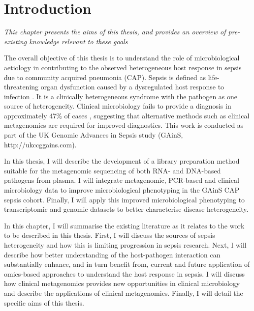 \chapter{Introduction}
\label{ch:Introduction}
\textit{This chapter presents the aims of this thesis, and provides an overview of pre-existing knowledge relevant to these goals}

\startcontents[chapters]{\vspace{-1.4cm}}
\singlespacing
{}
\doublespacing
\vspace{0.5cm}

The overall objective of this thesis is to understand the role of microbiological aetiology in contributing to the observed heterogeneous host response in sepsis due to community acquired pneumonia (CAP). Sepsis is defined as life-threatening organ dysfunction caused by a dysregulated host response to infection \parencite{Singer2016}. It is a clinically heterogeneous syndrome with the pathogen as one source of heterogeneity. Clinical microbiology fails to provide a diagnosis in approximately 47\% of cases \parencite{Gupta2016}, suggesting that alternative methods such as clinical metagenomics are required for improved diagnostics. This work is conducted as part of the UK Genomic Advances in Sepsis study (GAinS, http://ukccggains.com). 

In this thesis, I will describe the development of a library preparation method suitable for the metagenomic sequencing of both RNA- and DNA-based pathogens from plasma. I will integrate metagenomic, PCR-based and clinical microbiology data to improve microbiological phenotyping in the GAinS CAP sepsis cohort. Finally, I will apply this improved microbiological phenotyping to transcriptomic and genomic datasets to better characterise disease heterogeneity. 

In this chapter, I will summarise the existing literature as it relates to the work to be described in this thesis. First, I will discuss the sources of sepsis heterogeneity and how this is limiting progression in sepsis research. Next, I will describe how better understanding of the host-pathogen interaction can substantially enhance, and in turn benefit from, current and future application of omics-based approaches to understand the host response in sepsis. I will discuss how clinical metagenomics provides new opportunities in clinical microbiology and describe the applications of clinical metagenomics. Finally, I will detail the specific aims of this thesis. 

